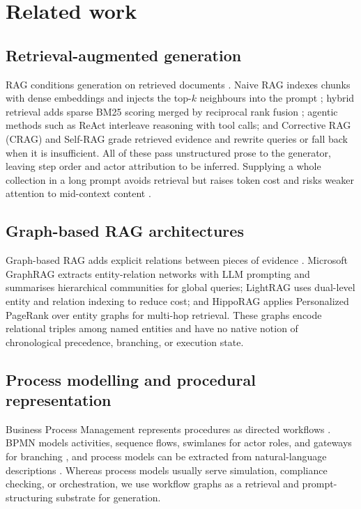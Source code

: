 \documentclass[preprint,10pt]{elsarticle}
\begin{document}
\section{Related work}
\label{sec:related}

\subsection{Retrieval-augmented generation}
RAG conditions generation on retrieved documents \cite{lewis2020rag}. Naive RAG indexes chunks with dense embeddings and injects the top-$k$ neighbours into the prompt \cite{gao2023ragsurvey}; hybrid retrieval adds sparse BM25 scoring \cite{robertson2009bm25} merged by reciprocal rank fusion \cite{cormack2009rrf}; agentic methods such as ReAct \cite{yao2023react} interleave reasoning with tool calls; and Corrective RAG (CRAG) \cite{yan2024crag} and Self-RAG \cite{asai2024selfrag} grade retrieved evidence and rewrite queries or fall back when it is insufficient. All of these pass unstructured prose to the generator, leaving step order and actor attribution to be inferred. Supplying a whole collection in a long prompt avoids retrieval but raises token cost and risks weaker attention to mid-context content \cite{liu2024lost}.

\subsection{Graph-based RAG architectures}
Graph-based RAG adds explicit relations between pieces of evidence \cite{peng2024graphragsurvey,pan2024unifying}. Microsoft GraphRAG \cite{edge2024graphrag} extracts entity-relation networks with LLM prompting and summarises hierarchical communities for global queries; LightRAG \cite{guo2024lightrag} uses dual-level entity and relation indexing to reduce cost; and HippoRAG \cite{gutierrez2024hipporag} applies Personalized PageRank over entity graphs for multi-hop retrieval. These graphs encode relational triples among named entities and have no native notion of chronological precedence, branching, or execution state.

\subsection{Process modelling and procedural representation}
Business Process Management represents procedures as directed workflows \cite{dumas2018fundamentals}. BPMN models activities, sequence flows, swimlanes for actor roles, and gateways for branching \cite{omg2011bpmn}, and process models can be extracted from natural-language descriptions \cite{friedrich2011process}. Whereas process models usually serve simulation, compliance checking, or orchestration, we use workflow graphs as a retrieval and prompt-structuring substrate for generation.
\end{document}
